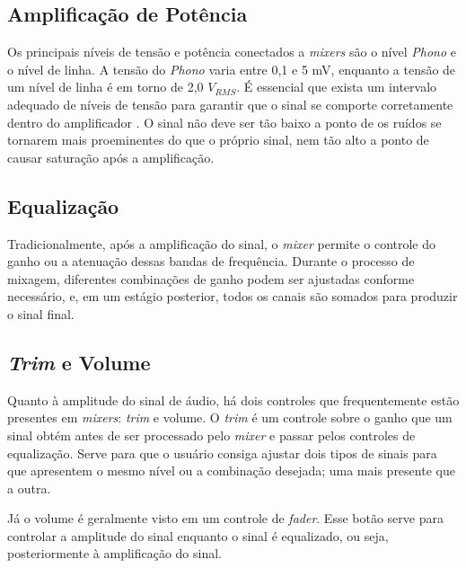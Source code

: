 
\subsection{Amplificação de Potência}

Os principais níveis de tensão e potência conectados a \textit{mixers} são o nível \textit{Phono} e o nível de linha. A tensão do \textit{Phono} varia entre 0,1 e 5 mV, enquanto a tensão de um nível de linha é em torno de 2,0 $V_{RMS}$. É essencial que exista um intervalo adequado de níveis de tensão para garantir que o sinal se comporte corretamente dentro do amplificador \cite{self2013audio}. O sinal não deve ser tão baixo a ponto de os ruídos se tornarem mais proeminentes do que o próprio sinal, nem tão alto a ponto de causar saturação após a amplificação. 


\subsection{Equalização}


Tradicionalmente, após a amplificação do sinal, o \textit{mixer} permite o controle do ganho ou a atenuação dessas bandas de frequência. Durante o processo de mixagem, diferentes combinações de ganho podem ser ajustadas conforme necessário, e, em um estágio posterior, todos os canais são somados para produzir o sinal final.

\subsection{\textit{Trim} e Volume}
Quanto à amplitude do sinal de áudio, há dois controles que frequentemente estão presentes em \textit{mixers}: \textit{trim} e volume. O \textit{trim} é um controle sobre o ganho que um sinal obtém antes de ser processado pelo \textit{mixer} e passar pelos controles de equalização. Serve para que o usuário consiga ajustar dois tipos de sinais para que apresentem o mesmo nível ou a combinação desejada; uma mais presente que a outra.
\par
Já o volume é geralmente visto em um controle de \textit{fader}. Esse botão serve para controlar a amplitude do sinal enquanto o sinal é equalizado, ou seja, posteriormente à amplificação do sinal.

